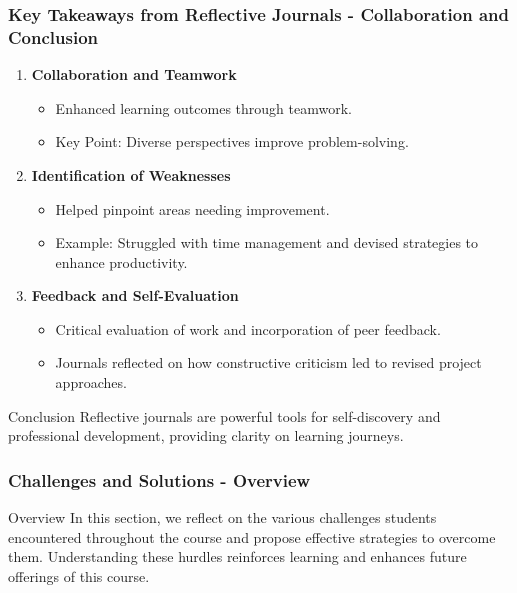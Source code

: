 \documentclass{beamer}
\begin{document}
\begin{frame}[fragile]
    \frametitle{Key Takeaways from Reflective Journals - Collaboration and Conclusion}
    \begin{enumerate}[resume]
        \item \textbf{Collaboration and Teamwork}
            \begin{itemize}
                \item Enhanced learning outcomes through teamwork.
                \item Key Point: Diverse perspectives improve problem-solving.
            \end{itemize}
        \item \textbf{Identification of Weaknesses}
            \begin{itemize}
                \item Helped pinpoint areas needing improvement.
                \item Example: Struggled with time management and devised strategies to enhance productivity.
            \end{itemize}
        \item \textbf{Feedback and Self-Evaluation}
            \begin{itemize}
                \item Critical evaluation of work and incorporation of peer feedback.
                \item Journals reflected on how constructive criticism led to revised project approaches.
            \end{itemize}
    \end{enumerate}
    \begin{block}{Conclusion}
        Reflective journals are powerful tools for self-discovery and professional development, providing clarity on learning journeys.
    \end{block}
\end{frame}

\begin{frame}[fragile]
    \frametitle{Challenges and Solutions - Overview}
    \begin{block}{Overview}
        In this section, we reflect on the various challenges students encountered throughout the course and propose effective strategies to overcome them. Understanding these hurdles reinforces learning and enhances future offerings of this course.
    \end{block}
\end{frame}
\end{document}
